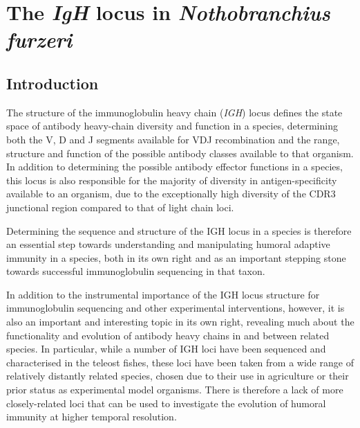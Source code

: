 
\chapter{The \textit{IgH} locus in \textit{Nothobranchius furzeri}}  
\onehalfspacing




\pagebreak



	

\section{Introduction}

The structure of the immunoglobulin heavy chain (\textit{IGH}) locus defines the state space of antibody heavy-chain diversity and function in a species, determining both the V, D and J segments available for VDJ recombination and the range, structure and function of the possible antibody classes available to that organism. In addition to determining the possible antibody effector functions in a species, this locus is also responsible for the majority of diversity in antigen-specificity available to an organism, due to the exceptionally high diversity of the CDR3 junctional region compared to that of light chain loci. 

Determining the sequence and structure of the IGH locus in a species is therefore an essential step towards understanding and manipulating humoral adaptive immunity in a species, both in its own right and as an important stepping stone towards successful immunoglobulin sequencing in that taxon.

In addition to the instrumental importance of the IGH locus structure for immunoglobulin sequencing and other experimental interventions, however, it is also an important and interesting topic in its own right, revealing much about the functionality and evolution of antibody heavy chains in and between related species. In particular, while a number of IGH loci have been sequenced and characterised in the teleost fishes, these loci have been taken from a wide range of relatively distantly related species, chosen due to their use in agriculture or their prior status as experimental model organisms. There is therefore a lack of more closely-related loci that can be used to investigate the evolution of humoral immunity at higher temporal resolution. 

